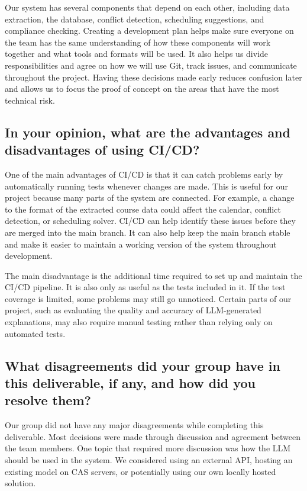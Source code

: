 \documentclass{article}
\begin{document}
Our system has several components that depend on each other, including data
extraction, the database, conflict detection, scheduling suggestions, and
compliance checking. Creating a development plan helps make sure everyone on the
team has the same understanding of how these components will work together and
what tools and formats will be used. It also helps us divide responsibilities
and agree on how we will use Git, track issues, and communicate throughout the
project. Having these decisions made early reduces confusion later and allows us
to focus the proof of concept on the areas that have the most technical risk.

\subsection*{In your opinion, what are the advantages and disadvantages of using CI/CD?}

One of the main advantages of CI/CD is that it can catch problems early by
automatically running tests whenever changes are made. This is useful for our
project because many parts of the system are connected. For example, a change to
the format of the extracted course data could affect the calendar, conflict
detection, or scheduling solver. CI/CD can help identify these issues before
they are merged into the main branch. It can also help keep the main branch
stable and make it easier to maintain a working version of the system throughout
development.

\bigskip
The main disadvantage is the additional time required to set up and maintain the
CI/CD pipeline. It is also only as useful as the tests included in it. If the
test coverage is limited, some problems may still go unnoticed. Certain parts of
our project, such as evaluating the quality and accuracy of LLM-generated
explanations, may also require manual testing rather than relying only on
automated tests.

\subsection*{What disagreements did your group have in this deliverable, if any, and how did you resolve them?}

Our group did not have any major disagreements while completing this
deliverable. Most decisions were made through discussion and agreement between
the team members. One topic that required more discussion was how the LLM should
be used in the system. We considered using an external API, hosting an existing
model on CAS servers, or potentially using our own locally hosted solution.
\end{document}

